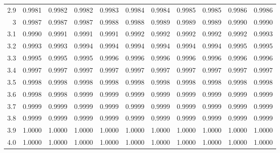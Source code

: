\begin{table}[t]
\begin{tabular}{r|rrrrr|rrrrr}
		2.9 & 0.9981 & 0.9982 & 0.9982 & 0.9983 & 0.9984 & 0.9984 & 0.9985 & 0.9985 & 0.9986 & 0.9986 \\ 
		\rowcolor{lightgray}3 & 0.9987 & 0.9987 & 0.9987 & 0.9988 & 0.9988 & 0.9989 & 0.9989 & 0.9989 & 0.9990 & 0.9990 \\
		3.1 & 0.9990 & 0.9991 & 0.9991 & 0.9991 & 0.9992 & 0.9992 & 0.9992 & 0.9992 & 0.9992 & 0.9993 \\  
		\rowcolor{lightgray}3.2 & 0.9993 & 0.9993 & 0.9994 & 0.9994 & 0.9994 & 0.9994 & 0.9994 & 0.9994 & 0.9995 & 0.9995 \\ 
		3.3 & 0.9995 & 0.9995 & 0.9995 & 0.9996 & 0.9996 & 0.9996 & 0.9996 & 0.9996 & 0.9996 & 0.9996 \\ 
		\rowcolor{lightgray}3.4 & 0.9997 & 0.9997 & 0.9997 & 0.9997 & 0.9997 & 0.9997 & 0.9997 & 0.9997 & 0.9997 & 0.9997 \\ 
		3.5 & 0.9998 & 0.9998 & 0.9998 & 0.9998 & 0.9998 & 0.9998 & 0.9998 & 0.9998 & 0.9998 & 0.9998 \\ 
		\rowcolor{lightgray}3.6 & 0.9998 & 0.9998 & 0.9999 & 0.9999 & 0.9999 & 0.9999 & 0.9999 & 0.9999 & 0.9999 & 0.9999 \\ 
		3.7 & 0.9999 & 0.9999 & 0.9999 & 0.9999 & 0.9999 & 0.9999 & 0.9999 & 0.9999 & 0.9999 & 0.9999 \\ 
		\rowcolor{lightgray}3.8 & 0.9999 & 0.9999 & 0.9999 & 0.9999 & 0.9999 & 0.9999 & 0.9999 & 0.9999 & 0.9999 & 0.9999 \\ 
		3.9 & 1.0000 & 1.0000 & 1.0000 & 1.0000 & 1.0000 & 1.0000 & 1.0000 & 1.0000 & 1.0000 & 1.0000 \\ 
		\rowcolor{lightgray}	4.0 & 1.0000 & 1.0000 & 1.0000 & 1.0000 & 1.0000 & 1.0000 & 1.0000 & 1.0000 & 1.0000 & 1.0000 \\ 
		\hline
	\end{tabular}
\end{table}


